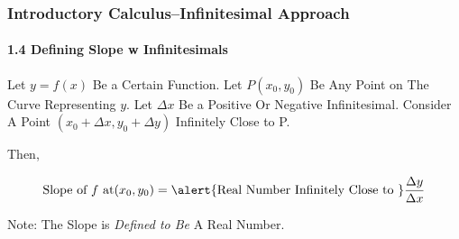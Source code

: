 \begin{frame}
\frametitle{Introductory Calculus--Infinitesimal Approach}
\framesubtitle{1.4 Defining Slope w Infinitesimals}
\label{slide:1.4-09}
\begin{definition}

Let $y=f(x)$ Be a Certain Function. Let $P(x_0,y_0)$ Be Any Point on The Curve Representing $y$. \alert{Let $\Delta x$ Be a Positive Or Negative Infinitesimal}. Consider A Point $(x_0+\Delta x,y_0+\Delta y)$ \alert{Infinitely Close to P}.

Then,

\[
\text{Slope of $f$ at} (x_0,y_0)=\text{\alert{Real Number Infinitely Close to }} \frac{\Delta y}{\Delta x}
\]
\label{def:slope}
\end{definition}
Note: The Slope is \textit{Defined to Be} A Real Number.
\end{frame}
